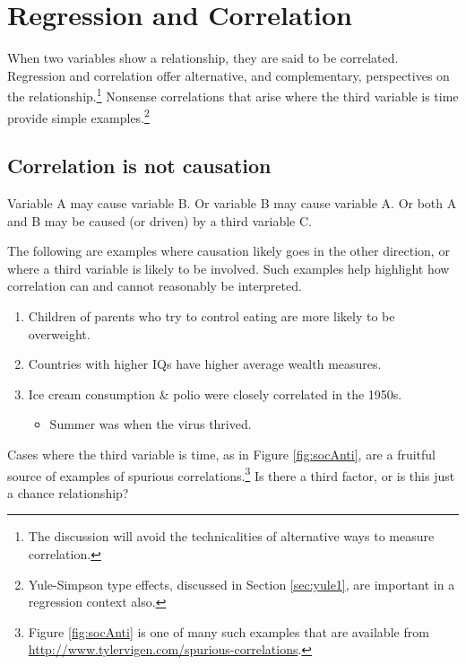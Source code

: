 \documentclass[
  10pt,
  b5paper]{book}
\providecommand{\tightlist}{%
  \setlength{\itemsep}{0pt}\setlength{\parskip}{0pt}}
\begin{document}
\hypertarget{sec:reg}{%
\chapter{Regression and Correlation}\label{sec:reg}}

When two variables show a relationship, they are said to be
correlated. Regression and correlation offer alternative,
and complementary, perspectives on the relationship.\footnote{The
  discussion will avoid the technicalities of alternative
  ways to measure correlation.}
Nonsense correlations that arise where the third variable is
time provide simple examples.\footnote{Yule-Simpson type effects,
  discussed in Section \ref{sec:yule1}, are important in a
  regression context also.}

\hypertarget{correlation-is-not-causation}{%
\section{Correlation is not causation}\label{correlation-is-not-causation}}

Variable A may cause variable B. Or variable B may cause
variable A. Or both A and B may be caused (or driven) by
a third variable C.

The following are examples where causation likely goes in the other
direction, or where a third variable is likely to be involved.
Such examples help highlight how correlation can and cannot
reasonably be interpreted.

\begin{enumerate}
\def\labelenumi{\arabic{enumi}.}
\tightlist
\item
  Children of parents who try to control eating are more likely
  to be overweight.
\item
  Countries with higher IQs have higher average wealth measures.
\item
  Ice cream consumption \& polio were closely correlated in the 1950s.

  \begin{itemize}
  \tightlist
  \item
    Summer was when the virus thrived.
  \end{itemize}
\end{enumerate}

Cases where the third variable is
time, as in Figure \ref{fig:socAnti}, are a fruitful source
of examples of spurious correlations.\footnote{Figure \ref{fig:socAnti}
  is one of many such examples that are available from\\
  \url{http://www.tylervigen.com/spurious-correlations}.}
Is there a third factor, or is this just a chance relationship?
\end{document}
